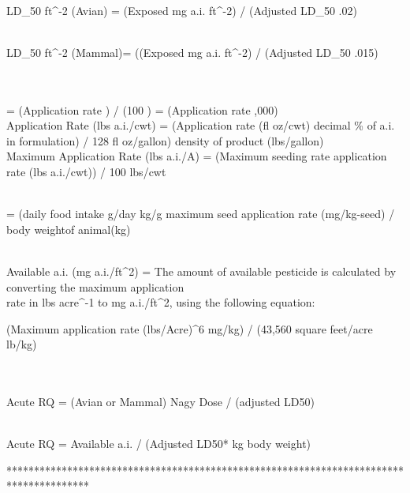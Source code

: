 \\LD_{50} \:ft^{-2}\: (Avian) = (Exposed \;  mg \; a.i.\; ft^{-2}) / (Adjusted\; LD_{50} \times .02)

\\LD_{50} \:ft^{-2} \: (Mammal)= ((Exposed \;  mg \; a.i.\; ft^{-2}) / (Adjusted\; LD_{50} \times .015)


\\
\\ = (Application\; rate\;  )
 / (100 ) = (Application \; rate  ,000)\\

Application\; Rate\; (lbs \;a.i./cwt) = (Application \;rate\; (fl\; oz/cwt) \times decimal\; \% \;of\; a.i.\; 
in \;formulation) / 128\; fl \;oz/\;gallon) \times density\; of\; product \;(lbs/gallon)\\
Maximum\; Application \;Rate (lbs\; a.i./A) = (Maximum \;seeding\; rate \times application \;rate (lbs\; a.i./cwt)) 
/ 100 \;lbs/cwt

\\ = (daily\; food\; intake\; g/day  \;
kg/g\; \times\; maximum \;seed \;application\; rate (mg/kg-seed) / body\; weight\;of \;animal\;(kg)

\\Available \;a.i.\; (mg \;a.i.\;/ft^{2}) = The\; amount \;of \;available \;pesticide \;is \;calculated\; by \;converting \;
the \;maximum \;application\; \\rate \;in \;lbs \;acre^{-1} \;to\; mg \;a.i./ft^{2}, using\; the\; following \;equation:\

(Maximum\; application\; rate (lbs/Acre)\times {}^{6} \;mg/kg) / (43,560 \;square \;feet/acre \;lb/kg)\\





\\

\\Acute\; RQ\; \sharp {} = (Avian \;or\; Mammal)\; Nagy\; Dose\; / (adjusted\; LD50)

\\Acute\; RQ \;\sharp {} = Available\; a.i. / (Adjusted \;LD50* kg \;body \;weight)

***************************************************************************************
\\

